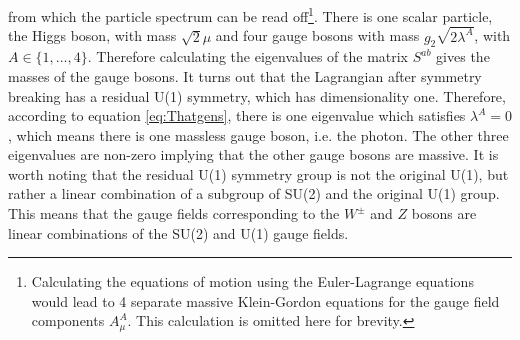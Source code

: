 from which the particle spectrum can be read off\footnote{Calculating the equations of motion using the Euler-Lagrange equations would lead to 4 separate massive Klein-Gordon equations for the gauge field components $A_\mu^A$. This calculation is omitted here for brevity.}. There is one scalar particle, the Higgs boson, with mass $\sqrt{2}\mu$ and four gauge bosons with mass $g_2\sqrt{2\lambda^A}$, with $A\in\{1,\ldots,4\}$. Therefore calculating the eigenvalues of the matrix $S^{ab}$ gives the masses of the gauge bosons. It turns out that the Lagrangian after symmetry breaking has a residual U(1) symmetry, which has dimensionality one. Therefore, according to equation \ref{eq:Thatgens}, there is one eigenvalue which satisfies $\lambda^A=0$, which means there is one massless gauge boson, i.e. the photon. The other three eigenvalues are non-zero implying that the other gauge bosons are massive. It is worth noting that the residual U(1) symmetry group is not the original U(1), but rather a linear combination of a subgroup of SU(2) and the original U(1) group. This means that the gauge fields corresponding to the $W^{\pm}$ and $Z$ bosons are linear combinations of the SU(2) and U(1) gauge fields.
